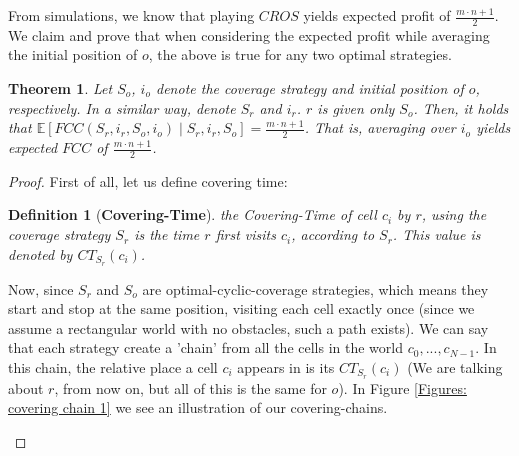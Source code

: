 \documentclass[a4paper,10pt]{article}
\newtheorem{theorem}{Theorem}[section]
\newtheorem{definition}{Definition}
\newcommand\rob{\ensuremath{r}\xspace}
\newcommand\opp{\ensuremath{o}\xspace}
\newcommand{\fcc}{\ensuremath{FCC}\xspace}
\newcommand{\cros}{\ensuremath{CROS}\xspace}
\begin{document}
From simulations, we know that playing \cros yields expected profit of $\frac{m\cdot n+1}{2}$. We claim and prove that when considering the expected profit while averaging the initial position of \opp, the above is true for any two optimal strategies.
\begin{theorem}\label{theorems:expected FCC, only So known}
Let $S_{\opp}$, $i_{\opp}$ denote the coverage strategy and initial position of \opp, respectively. In a similar way, denote $S_{\rob}$ and $i_r$. \rob is given only $S_{\opp}$. Then, it holds that $\mathbb{E}\left[\fcc\left(S_{\rob}, i_r, S_{\opp}, i_{\opp}\right) \mid S_{\rob}, i_r, S_{\opp}\right]=\frac{m\cdot n+1}{2}$. That is, averaging over $i_{\opp}$ yields expected \fcc of $\frac{m\cdot n+1}{2}$.
\end{theorem}
\begin{proof}
First of all, let us define covering time: 
\begin{definition}[\textbf{Covering-Time}]
the Covering-Time of cell $c_i$ by \rob, using the coverage strategy $S_{\rob}$ is the time \rob first visits $c_i$, according to $S_{\rob}$. This value is denoted by ${CT}_{S_{\rob}}(c_i)$.
\end{definition}
Now, since $S_{\rob}$ and $S_{\opp}$ are optimal-cyclic-coverage strategies, which means they start and stop at the same position, visiting each cell exactly once (since we assume a rectangular world with no obstacles, such a path exists). We can say that each strategy create a 'chain' from all the cells in the world $c_0,...,c_{N-1}$. In this chain, the relative place a cell $c_i$ appears in is its ${CT}_{S_{\rob}}(c_i)$ (We are talking about \rob,  from now on, but all of this is the same for \opp). In Figure \ref{Figures: covering chain 1} we see an illustration of our covering-chains.
\begin{figure}
\centering



\end{figure}
\end{proof}
\end{document}
